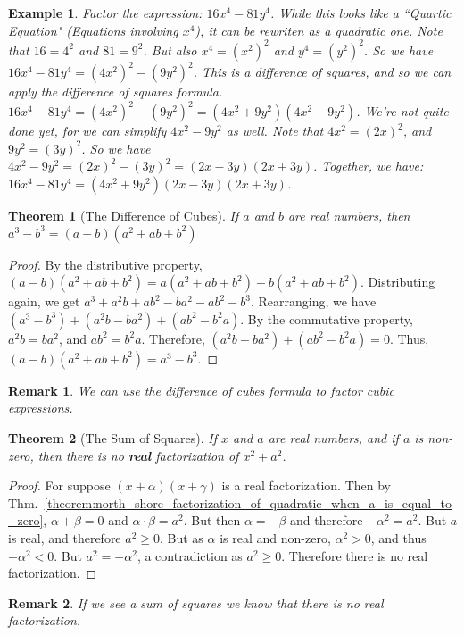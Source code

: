 \documentclass{article}
\theoremstyle{mystyle}
\newtheorem{theorem}{Theorem}[section]
\newtheorem{example}{Example}[section]
\newtheorem{remark}{Remark}[section]
\begin{document}
\begin{example}
Factor the expression: $16x^4 - 81y^4$. While this looks like a ``Quartic Equation" (Equations involving $x^4$), it can be rewriten as a quadratic one. Note that $16 = 4^2$ and $81 = 9^2$. But also $x^4 = (x^2)^2$ and $y^4 = (y^2)^2$. So we have $16x^4-81y^4 = (4x^2)^2 - (9y^2)^2$. This is a difference of squares, and so we can apply the difference of squares formula. $16x^4 - 81y^4 = (4x^2)^2 - (9y^2)^2 = (4x^2 + 9y^2)(4x^2 - 9y^2)$. We're not quite done yet, for we can simplify $4x^2 - 9y^2$ as well. Note that $4x^2 = (2x)^2$, and $9y^2 = (3y)^2$. So we have $4x^2 - 9y^2 = (2x)^2 - (3y)^2 = (2x-3y)(2x+3y)$. Together, we have: $16x^4 - 81y^4 = (4x^2 + 9y^2)(2x-3y)(2x+3y)$.
\end{example}
\begin{theorem}[The Difference of Cubes]
\label{theorem:north_shore_difference_of_cubes}
If $a$ and $b$ are real numbers, then $a^{3}-b^{3}=(a-b)(a^{2}+ab+b^{2})$
\end{theorem}
\begin{proof}
By the distributive property, $(a-b)(a^2+ab+b^2) = a(a^2+ab+b^2) - b(a^2+ab+b^2)$. Distributing again, we get $a^3 + a^2b + ab^2 - ba^2 - ab^2 - b^3$. Rearranging, we have $(a^3 - b^3) + (a^2b - ba^2) + (ab^2 - b^2a)$. By the commutative property, $a^2b = ba^2$, and $ab^2 = b^2a$. Therefore, $(a^2b - ba^2)+(ab^2 - b^2a) = 0$. Thus, $(a-b)(a^2+ab+b^2) = a^3 - b^3$.
\end{proof}
\begin{remark}
We can use the difference of cubes formula to factor cubic expressions.
\end{remark}
\begin{theorem}[The Sum of Squares]
\label{theorem:north_shore_sum_of_squares}
If $x$ and $a$ are real numbers, and if $a$ is non-zero, then there is no \textbf{real} factorization of $x^2+a^2$.
\end{theorem}
\begin{proof}
For suppose $(x+\alpha)(x+\gamma)$ is a real factorization. Then by Thm.~\ref{theorem:north_shore_factorization_of_quadratic_when_a_is_equal_to_zero}, $\alpha+\beta = 0$ and $\alpha\cdot \beta = a^2$. But then $\alpha = -\beta$ and therefore $-\alpha^2 = a^2$. But $a$ is real, and therefore $a^2 \geq 0$. But as $\alpha$ is real and non-zero, $\alpha^2> 0$, and thus $-\alpha^2 <0$. But $a^2 = -\alpha^2$, a contradiction as $a^2 \geq 0$. Therefore there is no real factorization.
\end{proof}
\begin{remark}
If we see a sum of squares we know that there is no real factorization.
\end{remark}
\end{document}
